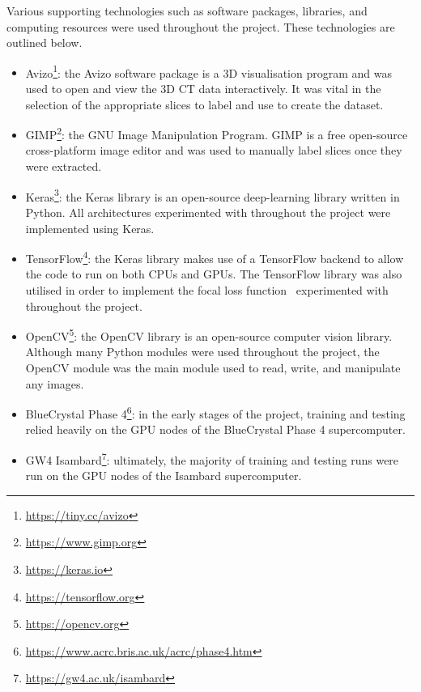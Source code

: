 Various supporting technologies such as software packages, libraries, and computing resources were used throughout the project. These technologies are outlined below.

\vspace{0.5cm} 

\begin{itemize}
\item Avizo\footnote{\url{https://tiny.cc/avizo}}: the Avizo software package is a 3D visualisation program and was used to open and view the 3D CT data interactively. It was vital in the selection of the appropriate slices to label and use to create the dataset.
\item GIMP\footnote{\url{https://www.gimp.org}}: the GNU Image Manipulation Program. GIMP is a free open-source cross-platform image editor and was used to manually label slices once they were extracted.
\item Keras\footnote{\url{https://keras.io}}: the Keras library is an open-source deep-learning library written in Python. All architectures experimented with throughout the project were implemented using Keras.
\item TensorFlow\footnote{\url{https://tensorflow.org}}: the Keras library makes use of a TensorFlow backend to allow the code to run on both CPUs and GPUs. The TensorFlow library was also utilised in order to implement the focal loss function~\cite{focalloss} experimented with throughout the project.
\item OpenCV\footnote{\url{https://opencv.org}}: the OpenCV library is an open-source computer vision library. Although many Python modules were used throughout the project, the OpenCV module was the main module used to read, write, and manipulate any images.
\item BlueCrystal Phase 4\footnote{\url{https://www.acrc.bris.ac.uk/acrc/phase4.htm}}: in the early stages of the project, training and testing relied heavily on the GPU nodes of the BlueCrystal Phase 4 supercomputer.
\item GW4 Isambard\footnote{\url{https://gw4.ac.uk/isambard}}: ultimately, the majority of training and testing runs were run on the GPU nodes of the Isambard supercomputer.
\end{itemize}